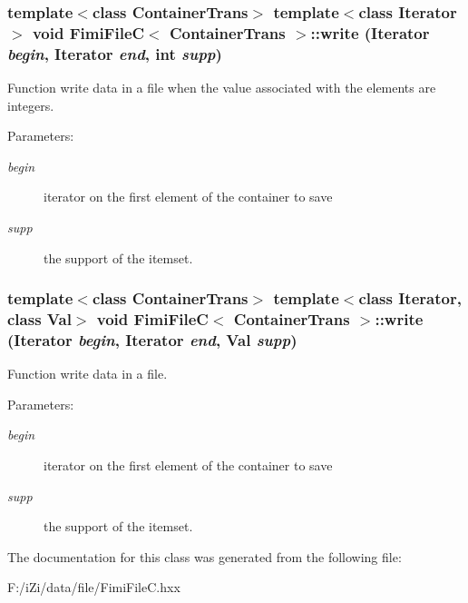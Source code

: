 \subsubsection{\setlength{\rightskip}{0pt plus 5cm}template$<$class Container\-Trans$>$ template$<$class Iterator$>$ void {\bf Fimi\-File\-C}$<$ Container\-Trans $>$::write (Iterator {\em begin}, Iterator {\em end}, int {\em supp})\hspace{0.3cm}{\tt  [protected]}}\label{class_fimi_file_c_467871a465fab1c1e30e2eaaa4264987}


Function write data in a file when the value associated with the elements are integers. 

\begin{Desc}
\item[Parameters:]
\begin{description}
\item[{\em begin}]iterator on the first element of the container to save \item[{\em supp}]the support of the itemset. \end{description}
\end{Desc}
\subsubsection{\setlength{\rightskip}{0pt plus 5cm}template$<$class Container\-Trans$>$ template$<$class Iterator, class Val$>$ void {\bf Fimi\-File\-C}$<$ Container\-Trans $>$::write (Iterator {\em begin}, Iterator {\em end}, Val {\em supp})\hspace{0.3cm}{\tt  [protected]}}\label{class_fimi_file_c_5c07f3dcb79c7e3c574d292483f5ed53}


Function write data in a file. 

\begin{Desc}
\item[Parameters:]
\begin{description}
\item[{\em begin}]iterator on the first element of the container to save \item[{\em supp}]the support of the itemset. \end{description}
\end{Desc}


The documentation for this class was generated from the following file:\begin{CompactItemize}
\item 
F:/i\-Zi/data/file/Fimi\-File\-C.hxx\end{CompactItemize}

